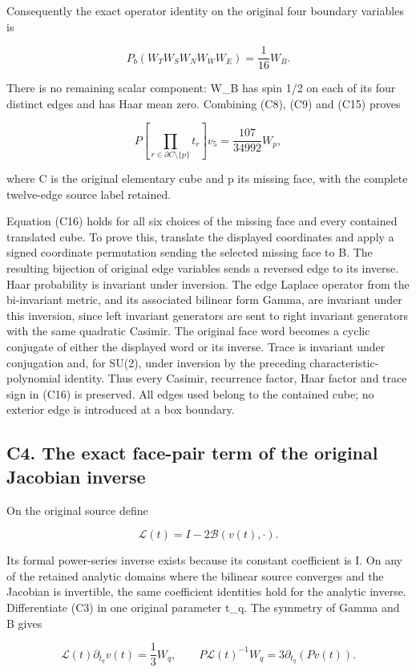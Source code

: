 \documentclass[11pt]{article}
\begin{document}
Consequently the exact operator identity on the original four boundary variables is

\[
 \boxed{P_b(W_TW_SW_NW_WW_E)=\frac1{16}W_B.} \tag{C15}
\]

There is no remaining scalar component: W\_B has spin 1/2 on each of its four distinct edges and has Haar mean zero. Combining (C8), (C9) and (C15) proves

\[
 \boxed{P[\prod_{r\in\partial C\setminus\{p\}}t_r]v_5
       =\frac{107}{34992}W_p,} \tag{C16}
\]

where C is the original elementary cube and p its missing face, with the complete twelve-edge source label retained.

Equation (C16) holds for all six choices of the missing face and every contained translated cube. To prove this, translate the displayed coordinates and apply a signed coordinate permutation sending the selected missing face to B. The resulting bijection of original edge variables sends a reversed edge to its inverse. Haar probability is invariant under inversion. The edge Laplace operator from the bi-invariant metric, and its associated bilinear form Gamma, are invariant under this inversion, since left invariant generators are sent to right invariant generators with the same quadratic Casimir. The original face word becomes a cyclic conjugate of either the displayed word or its inverse. Trace is invariant under conjugation and, for SU(2), under inversion by the preceding characteristic-polynomial identity. Thus every Casimir, recurrence factor, Haar factor and trace sign in (C16) is preserved. All edges used belong to the contained cube; no exterior edge is introduced at a box boundary.

\subsection*{C4. The exact face-pair term of the original Jacobian inverse}

On the original source define

\[
 \mathcal L(t)=I-2\mathcal B(v(t),\cdot). \tag{C17}
\]

Its formal power-series inverse exists because its constant coefficient is I. On any of the retained analytic domains where the bilinear source converges and the Jacobian is invertible, the same coefficient identities hold for the analytic inverse. Differentiate (C3) in one original parameter t\_q. The symmetry of Gamma and B gives

\[
 \mathcal L(t)\partial_{t_q}v(t)=\frac13W_q,
 \qquad
 P\mathcal L(t)^{-1}W_q=3\partial_{t_q}(Pv(t)). \tag{C18}
\]
\end{document}
